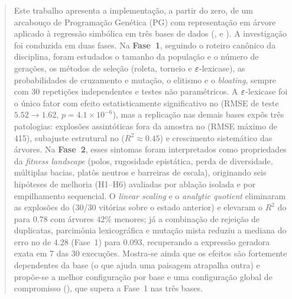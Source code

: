 \begin{abstract}
\noindent
Este trabalho apresenta a implementação, a partir do zero, de um arcabouço de
Programação Genética (PG) com representação em árvore aplicado à regressão
simbólica em três bases de dados (,  e
). A investigação foi conduzida em duas fases. Na
\textbf{Fase~1}, seguindo o roteiro canônico da disciplina, foram estudados o
tamanho da população e o número de gerações, os métodos de seleção (roleta,
torneio e $\eps$-lexicase), as probabilidades de cruzamento e mutação, o
elitismo e o \emph{bloating}, sempre com 30 repetições independentes e testes
não paramétricos. A $\eps$-lexicase foi o único fator com efeito
estatisticamente significativo no  (RMSE de teste
$5.52 \to 1.62$, $p = 4.1\times10^{-6}$), mas a replicação nas demais bases
expôs três patologias: explosões assintóticas fora da amostra no
 (RMSE máximo de 415), subajuste estrutural no 
($R^2 \approx 0.45$) e crescimento sistemático das árvores. Na
\textbf{Fase~2}, esses sintomas foram interpretados como propriedades da
\emph{fitness landscape} (polos, rugosidade epistática, perda de diversidade,
múltiplas bacias, platôs neutros e barreiras de escala), originando seis
hipóteses de melhoria (H1--H6) avaliadas por ablação isolada e por
empilhamento sequencial. O \emph{linear scaling} e o \emph{analytic quotient}
eliminaram as explosões do  (30/30 vitórias sobre o estado
anterior) e elevaram o $R^2$ do  para $0.78$ com árvores
$42\%$ menores; já a combinação de rejeição de duplicatas, parcimônia
lexicográfica e mutação mista reduziu a mediana do erro no  de
$4.28$ (Fase~1) para $0.093$, recuperando a expressão geradora exata em 7 das
30 execuções. Mostra-se ainda que os efeitos são fortemente dependentes da
base (o que ajuda uma paisagem atrapalha outra) e propõe-se a melhor
configuração por base e uma configuração global de compromisso
(), que supera a Fase~1 nas três bases.

\end{abstract}
